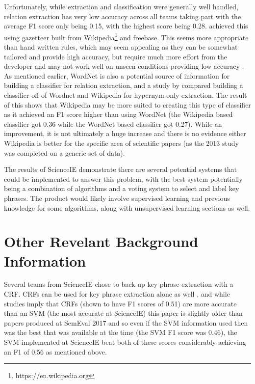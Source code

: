 Unfortunately, while extraction and classification were generally well handled, relation extraction has very low accuracy across all teams taking part with the average F1 score only being 0.15, with the highest score being 0.28. \cite{Ammar2017} achieved this using gazetteer built from Wikipedia\footnote{https://en.wikipedia.org} and freebase. This seems more appropriate than hand written rules, which may seem appealing as they can be somewhat tailored and provide high accuracy, but require much more effort from the developer and may not work well on unseen conditions providing low accuracy \cite{Manning2012}. As mentioned earlier, WordNet is also a potential source of information for building a classifier for relation extraction, and a study by \cite{Snow2013} compared building a classifier off of Wordnet and Wikipedia for hypernym-only extraction. The result of this shows that Wikipedia may be more suited to creating this type of classifier as it achieved an F1 score higher than using WordNet (the Wikipedia based classifier got 0.36 while the WordNet based classifier got 0.27). While an improvement, it is not ultimately a huge increase and there is no evidence either Wikipedia is better for the specific area of scientific papers (as the 2013 study was completed on a generic set of data).

The results of ScienceIE demonstrate there are several potential systems that could be implemented to answer this problem, with the best system potentially being a combination of algorithms and a voting system to select and label key phrases. The product would likely involve supervised learning and previous knowledge for some algorithms, along with unsupervised learning sections as well.

\section{Other Revelant Background Information}

Several teams from ScienceIE chose to back up key phrase extraction with a CRF. CRFs can be used for key phrase extraction alone as well \cite{Zhang2008}, and while studies imply that CRFs (shown to have F1 scores of 0.51) are more accurate than an SVM (the most accurate at ScienceIE) this paper is slightly older than papers produced at SemEval 2017 and so even if the SVM information used then was the best that was available at the time (the SVM F1 score was 0.46), the SVM implemented at ScienceIE beat both of these scores considerably achieving an F1 of 0.56 as mentioned above.

